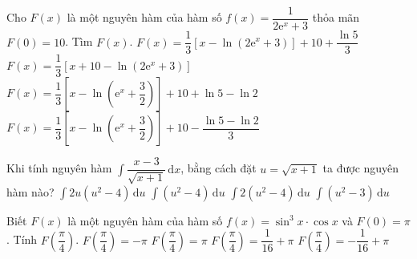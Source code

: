 \begin{ex}%
	Cho $F(x)$ là một nguyên hàm của hàm số $f(x)=\dfrac{1}{2\mathrm{e}^x+3}$ thỏa mãn $F(0)=10$. Tìm $F(x)$. 
	\choice
	{\True $F(x)=\dfrac{1}{3}\left[x-\ln\left(2\mathrm{e}^x+3\right)\right]+10+\dfrac{\ln 5}{3}$}
	{$F(x)=\dfrac{1}{3}\left[x+10-\ln\left(2\mathrm{e}^x+3\right)\right]$}
	{$F(x)=\dfrac{1}{3}\left[x-\ln\left(\mathrm{e}^x+\dfrac{3}{2}\right)\right]+10+\ln 5-\ln 2$}
	{$F(x)=\dfrac{1}{3}\left[x-\ln\left(\mathrm{e}^x+\dfrac{3}{2}\right)\right]+10-\dfrac{\ln 5-\ln 2}{3}$}
\end{ex}
\begin{ex}%
	Khi tính nguyên hàm $\displaystyle\int\dfrac{x-3}{\sqrt{x+1}}\mathrm{\,d}x$, bằng cách đặt $u=\sqrt{x+1}$ ta được nguyên hàm nào?
	\choice
	{$\displaystyle\int 2u\left(u^2-4\right)\mathrm{\,d}u$}
	{$\displaystyle\int\left(u^2-4\right)\mathrm{\,d}u$}
	{\True $\displaystyle\int 2\left(u^2-4\right)\mathrm{\,d}u$}
	{$\displaystyle\int\left(u^2-3\right)\mathrm{\,d}u$}
\end{ex}
\begin{ex}%
	Biết $F(x)$ là một nguyên hàm của hàm số $f(x)=\sin^3x\cdot\cos x$ và $F(0)=\pi$. Tính $F\left(\dfrac{\pi}{4}\right)$. 
	\choice
	{$F\left(\dfrac{\pi}{4}\right)=-\pi$}
	{$F\left(\dfrac{\pi}{4}\right)=\pi$}
	{\True $F\left(\dfrac{\pi}{4}\right)=\dfrac{1}{16}+\pi$}
	{$F\left(\dfrac{\pi}{4}\right)=-\dfrac{1}{16}+\pi$}
\end{ex}
